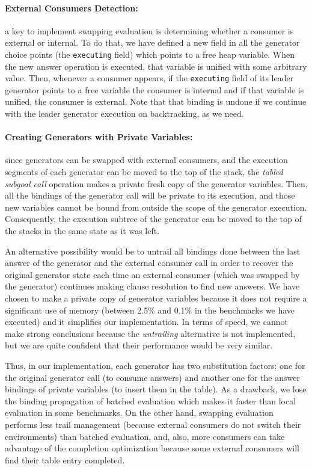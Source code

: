 \documentclass{./tlp}
\newcommand{\redsect}{\vspace{-1em}}
\begin{document}
\redsect
\paragraph{\textbf{External Consumers Detection:} }
a key to implement swapping
evaluation is determining whether a consumer is external or internal. To
do that, we have defined a new field in all the generator choice
points (the \lstinline{executing} field) which points to a free heap
variable. When the new answer operation is executed, that variable is
unified with some arbitrary value. Then, whenever a consumer appears,
if the \lstinline{executing} field of its leader generator points to a
free variable the consumer is internal and if that variable is
unified, the consumer is external. Note that that binding is undone if
we continue with the leader generator execution on backtracking, as we
need.



\redsect
\paragraph{\textbf{Creating Generators with Private Variables:} }
since generators can be swapped with external consumers, and the
execution segments of each generator can be moved to the top of the
stack, the \emph{tabled subgoal call} operation makes a private fresh
copy of the generator variables.  Then, all the bindings of the
generator call will be private to its execution, and those new
variables cannot be bound from outside the scope of the generator
execution.  Consequently, the execution subtree of the generator can
be moved to the top of the stacks in the same state as it was left.

An alternative possibility would be to untrail all bindings done
between the last answer of the generator and the external consumer
call in order to recover the original generator state each time an
external consumer (which was swapped by the generator) continues
making clause resolution to find new answers.  We have chosen to make
a private copy of generator variables because it does not require a
significant use of memory (between 2.5\% and 0.1\% in the benchmarks
we have executed) and it simplifies our implementation.  In terms of
speed, we cannot make strong conclusions because the \emph{untrailing}
alternative is not implemented, but we are quite confident that their
performance would be very similar.

Thus, in our implementation, each generator has two substitution
factors: one for the original generator call (to consume answers) and
another one for the answer bindings of private variables (to insert
them in the table). As a drawback, we lose the binding propagation of
batched evaluation which makes it faster than local evaluation in some
benchmarks.  On the other hand, swapping evaluation performs less trail
management (because external consumers do not switch their
environments) than batched evaluation, and, also, more consumers can
take advantage of the completion optimization because some external
consumers will find their table entry completed.
\end{document}
